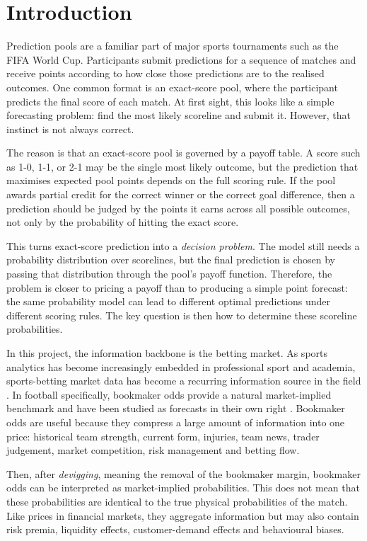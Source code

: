 \documentclass[11pt]{article}
\begin{document}
\section{Introduction}

Prediction pools are a familiar part of major sports tournaments such as the FIFA World Cup. Participants submit predictions for a sequence of matches and receive points according to how close those predictions are to the realised outcomes. One common format is an exact-score pool, where the participant predicts the final score of each match. At first sight, this looks like a simple forecasting problem: find the most likely scoreline and submit it. However, that instinct is not always correct.

The reason is that an exact-score pool is governed by a payoff table. A score such as 1-0, 1-1, or 2-1 may be the single most likely outcome, but the prediction that maximises expected pool points depends on the full scoring rule. If the pool awards partial credit for the correct winner or the correct goal difference, then a prediction should be judged by the points it earns across all possible outcomes, not only by the probability of hitting the exact score.

This turns exact-score prediction into a \emph{decision problem}. The model still needs a probability distribution over scorelines, but the final prediction is chosen by passing that distribution through the pool's payoff function. Therefore, the problem is closer to pricing a payoff than to producing a simple point forecast: the same probability model can lead to different optimal predictions under different scoring rules. The key question is then how to determine these scoreline probabilities.

In this project, the information backbone is the betting market. As sports analytics has become increasingly embedded in professional sport and academia, sports-betting market data has become a recurring information source in the field \cite{baumer2023}. In football specifically, bookmaker odds provide a natural market-implied benchmark and have been studied as forecasts in their own right \cite{forrest2005}. Bookmaker odds are useful because they compress a large amount of information into one price: historical team strength, current form, injuries, team news, trader judgement, market competition, risk management and betting flow.

Then, after \emph{devigging}, meaning the removal of the bookmaker margin, bookmaker odds can be interpreted as market-implied probabilities. This does not mean that these probabilities are identical to the true physical probabilities of the match. Like prices in financial markets, they aggregate information but may also contain risk premia, liquidity effects, customer-demand effects and behavioural biases.
\end{document}
